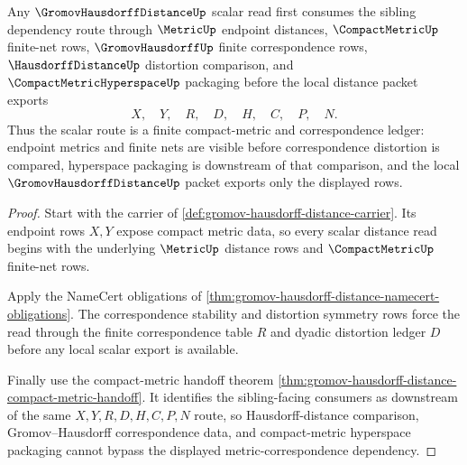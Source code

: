 \begin{theorem}
\label{thm:gromov-hausdorff-metric-correspondence-dependency}
Any $\GromovHausdorffDistanceUp$ scalar read first consumes the sibling dependency route through $\MetricUp$ endpoint distances, $\CompactMetricUp$ finite-net rows, $\GromovHausdorffUp$ finite correspondence rows, $\HausdorffDistanceUp$ distortion comparison, and $\CompactMetricHyperspaceUp$ packaging before the local distance packet exports
$$
X,\quad Y,\quad R,\quad D,\quad H,\quad C,\quad P,\quad N .
$$
Thus the scalar route is a finite compact-metric and correspondence ledger: endpoint metrics and finite nets are visible before correspondence distortion is compared, hyperspace packaging is downstream of that comparison, and the local $\GromovHausdorffDistanceUp$ packet exports only the displayed rows.
\end{theorem}
\begin{proof}
Start with the carrier of \autoref{def:gromov-hausdorff-distance-carrier}. Its endpoint rows $X,Y$ expose compact metric data, so every scalar distance read begins with the underlying $\MetricUp$ distance rows and $\CompactMetricUp$ finite-net rows.

Apply the NameCert obligations of \autoref{thm:gromov-hausdorff-distance-namecert-obligations}. The correspondence stability and distortion symmetry rows force the read through the finite correspondence table $R$ and dyadic distortion ledger $D$ before any local scalar export is available.

Finally use the compact-metric handoff theorem \autoref{thm:gromov-hausdorff-distance-compact-metric-handoff}. It identifies the sibling-facing consumers as downstream of the same $X,Y,R,D,H,C,P,N$ route, so Hausdorff-distance comparison, Gromov--Hausdorff correspondence data, and compact-metric hyperspace packaging cannot bypass the displayed metric-correspondence dependency.
\end{proof}
